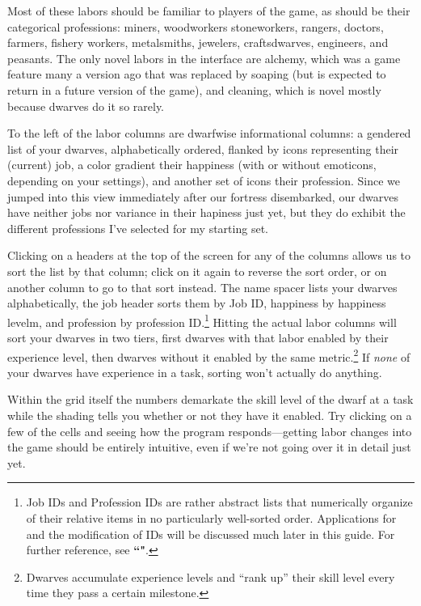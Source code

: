 \documentclass[]{article}
\begin{document}
Most of these labors should be familiar to players of the game, as should be their categorical
professions: miners, woodworkers stoneworkers, rangers, doctors, farmers, fishery workers, metalsmiths,
jewelers, craftsdwarves, engineers, and peasants. The only novel labors in the interface
are alchemy, which was a game feature many a version ago that was replaced by soaping (but is expected to
return in a future version of the game), and cleaning, which is novel mostly because dwarves do it so
rarely.

To the left of the labor columns are dwarfwise informational columns: a gendered list of your dwarves,
alphabetically ordered, flanked by icons representing their (current) job, a color gradient their
happiness (with or without emoticons, depending on your settings), and another set of icons their
profession. Since we jumped into this view immediately after our fortress disembarked, our dwarves have
neither jobs nor variance in their hapiness just yet, but they do exhibit the different professions I've
selected for my starting set.

Clicking on a headers at the top of the screen for any of the columns allows us to sort the list by that
column; click on it again to reverse the sort order, or on another column to go to that sort instead.
The name spacer lists your dwarves alphabetically, the job header sorts them by Job ID, happiness by
happiness levelm, and profession by profession ID.\footnote{\label{footnote} Job IDs and Profession IDs
are rather abstract lists that numerically organize of their relative items in no particularly
well-sorted order.
Applications for and the modification of IDs will be discussed much later in this guide. For further
reference, see \textbf{``"}.} Hitting the actual labor columns will sort your
dwarves in two tiers, first dwarves with that labor enabled by their experience level, then dwarves
without it enabled by the same metric.\footnote{Dwarves accumulate experience levels and ``rank up''
their skill level every time they pass a certain milestone.} If \emph{none} of your dwarves have
experience in a task, sorting won't actually do anything.

Within the grid itself the numbers demarkate the skill level of the dwarf at a task while the shading
tells you whether or not they have it enabled. Try clicking on a few of the cells and seeing how the
program responds---getting labor changes into the game should be entirely intuitive, even if we're not
going over it in detail just yet.
\end{document}
